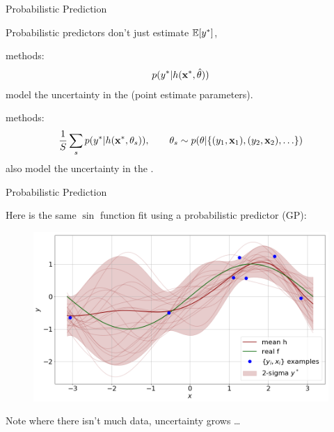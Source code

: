 \documentclass[lualatex, aspectratio=169]{beamer}
\begin{document}
\begin{frame}{Probabilistic Prediction}

  Probabilistic predictors don't just estimate $\mathbb{E}\!\left[{{y}^{*}}\right]$,

  \begin{description}[\leftmargin=0cm]
    \item[Maximum Likelihood] methods:
      \begin{align*}
        p({y}^{*} | h({\mathbf{x}}^{*}, \hat\theta))
      \end{align*}
      model the uncertainty in the  (point estimate parameters).
    \item[Bayesian] methods:
      \begin{align*}
        \frac{1}{S} \sum_s p({y}^{*} | h({\mathbf{x}}^{*}, \theta_s)),
          \qquad \theta_s \sim p(\theta | \{(y_1, \mathbf{x}_1), (y_2, \mathbf{x}_2), \ldots \})
      \end{align*}
      also model the uncertainty in the .
  \end{description}
\end{frame}


\begin{frame}{Probabilistic Prediction}

  Here is the same $\sin$ function fit using a probabilistic predictor (GP):
  \begin{figure}
    \includegraphics[width=0.6\pagewidth]{assets/probabilistic.png}
  \end{figure}
  Note where there isn't much data, uncertainty grows \ldots

\end{frame}
\end{document}

